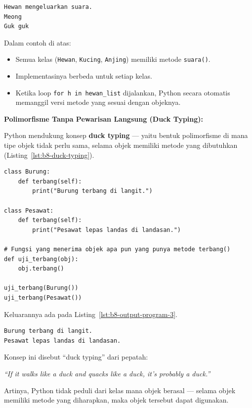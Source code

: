 \begin{lstlisting}[language=bash, caption={Output Program}, label={lst:b8-output-program-2}]
Hewan mengeluarkan suara.
Meong
Guk guk
\end{lstlisting}

Dalam contoh di atas:
\begin{itemize}
    \item Semua kelas (\texttt{Hewan}, \texttt{Kucing}, \texttt{Anjing}) memiliki metode \texttt{suara()}.
    \item Implementasinya berbeda untuk setiap kelas.
    \item Ketika loop \texttt{for h in hewan\_list} dijalankan, Python secara otomatis memanggil versi metode yang sesuai dengan objeknya.
\end{itemize}

\textbf{Polimorfisme Tanpa Pewarisan Langsung (Duck Typing):}

Python mendukung konsep \textbf{duck typing} —  
yaitu bentuk polimorfisme di mana tipe objek tidak perlu sama, selama objek memiliki metode yang dibutuhkan (Listing~\ref{lst:b8-duck-typing}).

\begin{lstlisting}[style=PythonStyle, caption={Contoh Duck Typing}, label={lst:b8-duck-typing}]
class Burung:
    def terbang(self):
        print("Burung terbang di langit.")

class Pesawat:
    def terbang(self):
        print("Pesawat lepas landas di landasan.")

# Fungsi yang menerima objek apa pun yang punya metode terbang()
def uji_terbang(obj):
    obj.terbang()

uji_terbang(Burung())
uji_terbang(Pesawat())
\end{lstlisting}

Keluarannya ada pada Listing~\ref{lst:b8-output-program-3}.

\begin{lstlisting}[language=bash, caption={Output Program}, label={lst:b8-output-program-3}]
Burung terbang di langit.
Pesawat lepas landas di landasan.
\end{lstlisting}

Konsep ini disebut “duck typing” dari pepatah:
\begin{center}
\textit{“If it walks like a duck and quacks like a duck, it’s probably a duck.”}
\end{center}

Artinya, Python tidak peduli dari kelas mana objek berasal —  
selama objek memiliki metode yang diharapkan, maka objek tersebut dapat digunakan.

